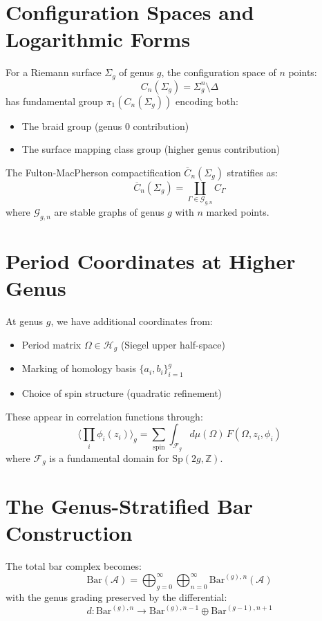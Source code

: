 
\section{Configuration Spaces and Logarithmic Forms}


For a Riemann surface $\Sigma_g$ of genus $g$, the configuration space of $n$ points:
$$C_n(\Sigma_g) = \Sigma_g^n \setminus \Delta$$
has fundamental group $\pi_1(C_n(\Sigma_g))$ encoding both:
\begin{itemize}
\item The braid group (genus 0 contribution)
\item The surface mapping class group (higher genus contribution)
\end{itemize}

The Fulton-MacPherson compactification $\overline{C}_n(\Sigma_g)$ stratifies as:
$$\overline{C}_n(\Sigma_g) = \coprod_{\Gamma \in \mathcal{G}_{g,n}} C_{\Gamma}$$
where $\mathcal{G}_{g,n}$ are stable graphs of genus $g$ with $n$ marked points.

\section{Period Coordinates at Higher Genus}

At genus $g$, we have additional coordinates from:
\begin{itemize}
\item Period matrix $\Omega \in \mathcal{H}_g$ (Siegel upper half-space)
\item Marking of homology basis $\{a_i, b_i\}_{i=1}^g$
\item Choice of spin structure (quadratic refinement)
\end{itemize}

These appear in correlation functions through:
$$\langle \prod_i \phi_i(z_i) \rangle_g = \sum_{\text{spin}} \int_{\mathcal{F}_g} d\mu(\Omega) \, F(\Omega, z_i, \phi_i)$$
where $\mathcal{F}_g$ is a fundamental domain for $\text{Sp}(2g, \mathbb{Z})$.

\section{The Genus-Stratified Bar Construction}

The total bar complex becomes:
$$\text{Bar}(\mathcal{A}) = \bigoplus_{g=0}^{\infty} \bigoplus_{n=0}^{\infty} \text{Bar}^{(g),n}(\mathcal{A})$$
with the genus grading preserved by the differential:
$$d: \text{Bar}^{(g),n} \to \text{Bar}^{(g),n-1} \oplus \text{Bar}^{(g-1),n+1}$$

